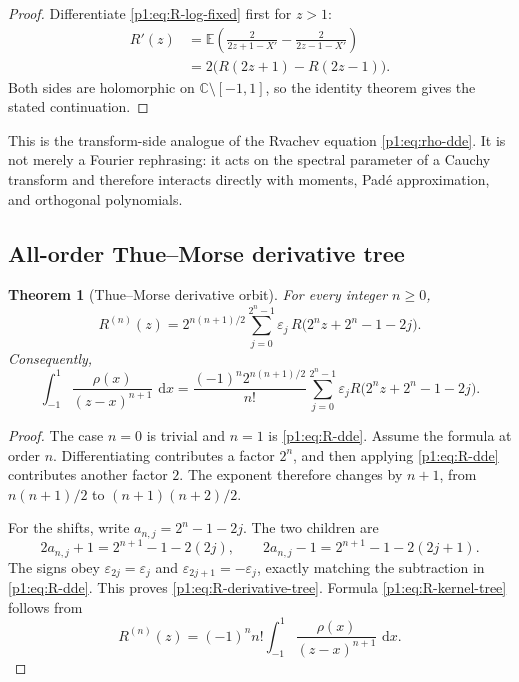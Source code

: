 \documentclass[11pt]{article}
\newtheorem{theorem}{Theorem}[section]
\theoremstyle{definition}
\theoremstyle{remark}
\newcommand{\C}{\mathbb C}
\newcommand{\E}{\mathbb E}
\newcommand{\dd}{\,\mathrm d}
\newcommand{\eps}{\varepsilon}
\begin{document}
\begin{proof}
Differentiate \eqref{p1:eq:R-log-fixed} first for \(z>1\):
\begin{align*}
 R'(z)
 &=\E\left(\frac{2}{2z+1-X'}-\frac{2}{2z-1-X'}\right)\\
 &=2\bigl(R(2z+1)-R(2z-1)\bigr).
\end{align*}
Both sides are holomorphic on \(\C\setminus[-1,1]\), so the identity theorem gives the
stated continuation.
\end{proof}

This is the transform-side analogue of the Rvachev equation \eqref{p1:eq:rho-dde}.  It is
not merely a Fourier rephrasing: it acts on the spectral parameter of a Cauchy transform and
therefore interacts directly with moments, Pad\'e approximation, and orthogonal polynomials.

\subsection{All-order Thue--Morse derivative tree}

\begin{theorem}[Thue--Morse derivative orbit]\label{p1:thm:R-derivative-tree}
For every integer \(n\ge0\),
\begin{equation}
 \boxed{
 R^{(n)}(z)=2^{n(n+1)/2}
 \sum_{j=0}^{2^n-1}\eps_j\,
 R\bigl(2^n z+2^n-1-2j\bigr).
 }                                                           \label{p1:eq:R-derivative-tree}
\end{equation}
Consequently,
\begin{equation}
 \int_{-1}^{1}\frac{\rho(x)}{(z-x)^{n+1}}\,\dd x
 =\frac{(-1)^n2^{n(n+1)/2}}{n!}
 \sum_{j=0}^{2^n-1}\eps_j
 R\bigl(2^n z+2^n-1-2j\bigr).                               \label{p1:eq:R-kernel-tree}
\end{equation}
\end{theorem}

\begin{proof}
The case \(n=0\) is trivial and \(n=1\) is \eqref{p1:eq:R-dde}.  Assume the formula at
order \(n\).  Differentiating contributes a factor \(2^n\), and then applying
\eqref{p1:eq:R-dde} contributes another factor \(2\).  The exponent therefore changes by
\(n+1\), from \(n(n+1)/2\) to \((n+1)(n+2)/2\).

For the shifts, write \(a_{n,j}=2^n-1-2j\).  The two children are
\[
 2a_{n,j}+1=2^{n+1}-1-2(2j),
 \qquad
 2a_{n,j}-1=2^{n+1}-1-2(2j+1).
\]
The signs obey \(\eps_{2j}=\eps_j\) and \(\eps_{2j+1}=-\eps_j\), exactly matching the
subtraction in \eqref{p1:eq:R-dde}.  This proves \eqref{p1:eq:R-derivative-tree}.  Formula
\eqref{p1:eq:R-kernel-tree} follows from
\[
 R^{(n)}(z)=(-1)^n n!\int_{-1}^{1}\frac{\rho(x)}{(z-x)^{n+1}}\,\dd x.
\]
\end{proof}
\end{document}
